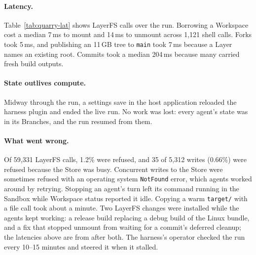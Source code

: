 \documentclass[letterpaper,twocolumn,10pt]{article}
\newcommand{\sys}{LayerFS}
\newcommand{\ws}{Workspace}
\begin{document}
\paragraph{Latency.} Table~\ref{tab:quarry-lat} shows \sys{} calls over the
run. Borrowing a \ws{} cost a median 7\,ms to mount and 14\,ms to unmount
across 1,121 shell calls. Forks took 5\,ms, and publishing an 11\,GB tree to
\texttt{main} took 7\,ms because a Layer names an existing root. Commits
took a median 204\,ms because many carried fresh build outputs.

\paragraph{State outlives compute.} Midway through the run, a settings save
in the host application reloaded the harness plugin and ended the live run.
No work was lost: every agent's state was in its Branches, and the run
resumed from them.

\paragraph{What went wrong.} Of 59,331 \sys{} calls, 1.2\% were refused,
and 35 of 5,312 writes (0.66\%) were refused because the Store was busy.
Concurrent writes to the Store were sometimes refused with an operating
system \texttt{NotFound} error, which agents worked around by retrying.
Stopping an agent's turn left its command running in the Sandbox while
\ws{} status reported it idle. Copying a warm \texttt{target/} with a file
call took about a minute. Two \sys{} changes were installed while the agents
kept working: a release build replacing a debug build of the Linux bundle,
and a fix that stopped unmount from waiting for a commit's deferred cleanup;
the latencies above are from after both. The harness's operator checked the
run every 10--15 minutes and steered it when it stalled.
\end{document}

